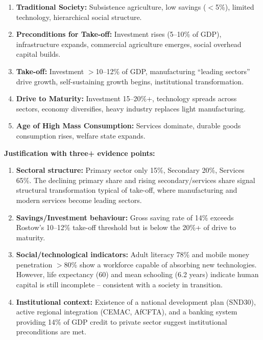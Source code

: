 \documentclass[11pt]{article}
\newcounter{popsec}
\newcounter{popsub}
\newcommand{\courssub}[1]{%
  \stepcounter{popsub}%
  \par\vspace{9pt}\noindent{\popxbold\fontsize{11.5}{13}\selectfont\color{popink}{\color{poporange}\thepopsec.\thepopsub}\hspace{6pt}#1}\par\nopagebreak\vspace{4pt}
}
\begin{document}
\courssub{Task 3 -- Rostow's Stages of Growth}

\begin{definition}
\begin{enumerate}
    \item \textbf{Traditional Society:} Subsistence agriculture, low savings ($<$5\%), limited technology, hierarchical social structure.
    \item \textbf{Preconditions for Take-off:} Investment rises (5--10\% of GDP), infrastructure expands, commercial agriculture emerges, social overhead capital builds.
    \item \textbf{Take-off:} Investment $>$10--12\% of GDP, manufacturing ``leading sectors'' drive growth, self-sustaining growth begins, institutional transformation.
    \item \textbf{Drive to Maturity:} Investment 15--20\%+, technology spreads across sectors, economy diversifies, heavy industry replaces light manufacturing.
    \item \textbf{Age of High Mass Consumption:} Services dominate, durable goods consumption rises, welfare state expands.
\end{enumerate}
\end{definition}

\begin{exemplebox}
\textbf{Justification with three+ evidence points:}
\begin{enumerate}
    \item \textbf{Sectoral structure:} Primary sector only 15\%, Secondary 20\%, Services 65\%. The declining primary share and rising secondary/services share signal structural transformation typical of take-off, where manufacturing and modern services become leading sectors.
    \item \textbf{Savings/Investment behaviour:} Gross saving rate of 14\% exceeds Rostow's 10--12\% take-off threshold but is below the 20\%+ of drive to maturity.
    \item \textbf{Social/technological indicators:} Adult literacy 78\% and mobile money penetration $>$80\% show a workforce capable of absorbing new technologies. However, life expectancy (60) and mean schooling (6.2 years) indicate human capital is still incomplete -- consistent with a society in transition.
    \item \textbf{Institutional context:} Existence of a national development plan (SND30), active regional integration (CEMAC, AfCFTA), and a banking system providing 14\% of GDP credit to private sector suggest institutional preconditions are met.
\end{enumerate}
\end{exemplebox}
\end{document}
